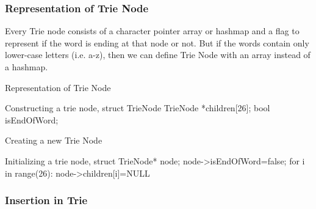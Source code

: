 \documentclass[11pt,a4paper]{article}
\begin{document}
\subsubsection{Representation of Trie Node}
Every Trie node consists of a character pointer array or hashmap and a flag to represent if the word is ending at that node or not. But if the words contain only lower-case letters (i.e. a-z), then we can define Trie Node with an array instead of a hashmap.
\begin{algorithm}[H]
\caption*{Representation of Trie Node}
\label{TrieNodepsuedocode}
\begin{algorithmic}
\STATE Constructing a trie node, 
\STATE \hspace{0.3cm} struct TrieNode
\STATE \hspace{1cm} TrieNode *children[26];
\STATE \hspace{1cm} bool isEndOfWord;
\end{algorithmic}
\end{algorithm}
\begin{algorithm}[H]
\begin{algorithmic}
\caption*{Creating a new Trie Node}
\STATE Initializing a trie node, 
\STATE \hspace{0.3cm} struct TrieNode* node;
\STATE \hspace{0.3cm} node->isEndOfWord=false;
\STATE \hspace{0.3cm} for i in range(26):
\STATE \hspace{1cm} node->children[i]=NULL   
\end{algorithmic}
\end{algorithm}

\subsubsection{Insertion in Trie}
\label{subsec:naiveInsertionalgorithm}
\end{document}
